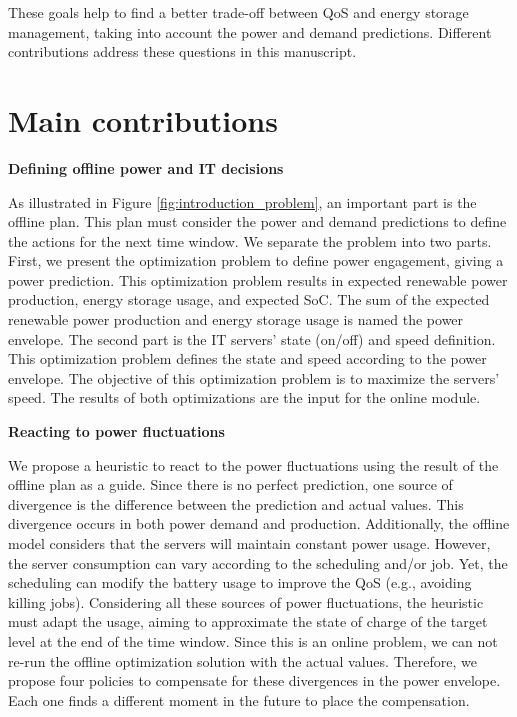 These goals help to find a better trade-off between QoS and energy storage management, taking into account the power and demand predictions. Different contributions address these questions in this manuscript.

\section{Main contributions}

\begin{center}
    \textbf{Defining offline power and IT decisions}
\end{center}
As illustrated in Figure \ref{fig:introduction_problem}, an important part is the offline plan. This plan must consider the power and demand predictions to define the actions for the next time window. We separate the problem into two parts. First, we present the optimization problem to define power engagement, giving a power prediction. This optimization problem results in expected renewable power production, energy storage usage, and expected SoC. The sum of the expected renewable power production and energy storage usage is named the power envelope. The second part is the IT servers' state (on/off) and speed definition. This optimization problem defines the state and speed according to the power envelope. The objective of this optimization problem is to maximize the servers' speed. The results of both optimizations are the input for the online module.

\begin{center}
    \textbf{Reacting to power fluctuations}
\end{center}
We propose a heuristic to react to the power fluctuations using the result of the offline plan as a guide. Since there is no perfect prediction, one source of divergence is the difference between the prediction and actual values. This divergence occurs in both power demand and production. Additionally, the offline model considers that the servers will maintain constant power usage. However, the server consumption can vary according to the scheduling and/or job. Yet, the scheduling can modify the battery usage to improve the QoS (e.g., avoiding killing jobs). Considering all these sources of power fluctuations, the heuristic must adapt the usage, aiming to approximate the state of charge of the target level at the end of the time window. Since this is an online problem, we can not re-run the offline optimization solution with the actual values. Therefore, we propose four policies to compensate for these divergences in the power envelope. Each one finds a different moment in the future to place the compensation. 

